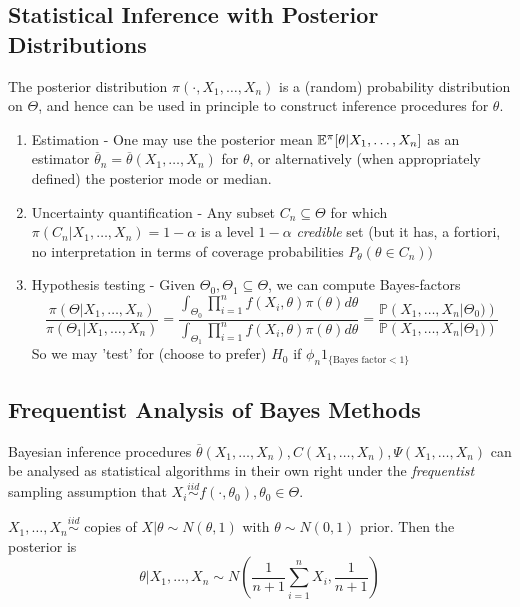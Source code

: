 \documentclass[a4paper]{article}
\begin{document}
\subsection{Statistical Inference with Posterior Distributions}

The posterior distribution $\pi(\cdot, X_1, \ldots, X_n)$ is a (random) probability distribution on $\Theta$, and hence can be used in principle to construct inference procedures for $\theta$.
\begin{enumerate}[label=\roman*)]
	\item Estimation - One may use the posterior mean $\mathbb{E}^{\pi} [\theta | X_1, \ldots, X_n]$ as an estimator $\overline{\theta}_n = \overline{\theta}(X_1, \ldots, X_n)$ for $\theta$, or alternatively (when appropriately  defined) the posterior mode or median.
	\item Uncertainty quantification - Any subset $C_n \subseteq \Theta$ for which $\pi(C_n|X_1, \ldots, X_n) = 1-\alpha$ is a level $1-\alpha$ \textit{credible} set (but it has, a fortiori, no interpretation in terms of coverage probabilities $P_{\theta} (\theta  \in C_n))$ 
	\item Hypothesis testing - Given $\Theta_0, \Theta_1 \subseteq \Theta$, we can compute Bayes-factors
		\[
			\frac{\pi(\Theta | X_1, \ldots, X_n)}{\pi(\Theta_1|X_1, \ldots, X_n)} = \frac{\int_{\Theta_0} \prod_{i=1}^{n} f(X_i, \theta)\pi(\theta)d\theta}{\int_{\Theta_1} \prod_{i=1}^{n}f(X_i, \theta) \pi(\theta) d\theta} = \frac{\mathbb{P}\left( X_1, \ldots, X_n | \Theta_0) \right)}{\mathbb{P}\left( X_1, \ldots, X_n| \Theta_1) \right)}
		\]
		So we may 'test' for (choose to prefer) $H_0$ if $\phi_n 1_{\{\text{Bayes factor} <1\}}$
\end{enumerate}

\subsection{Frequentist Analysis of Bayes Methods}

Bayesian inference procedures $\overline{\theta}(X_1, \ldots, X_n), C(X_1, \ldots, X_n), \Psi(X_1, \ldots, X_n)$ can be analysed as statistical algorithms in their own right under the \textit{frequentist} sampling assumption that $X_i \stackrel{iid}{\sim} f(\cdot, \theta_0), \theta_0 \in \Theta$.

\begin{eg}
	$X_1, \ldots, X_n \stackrel{iid}{\sim}$ copies of $X|\theta \sim N(\theta, 1)$ with $\theta \sim N(0, 1)$ prior. Then the posterior is
	 \[
		 \theta | X_1, \ldots, X_n \sim N\left( \frac{1}{n+1} \sum_{i=1}^{n}X_i, \frac{1}{n+1} \right) 
	\]
\end{eg}
\end{document}
